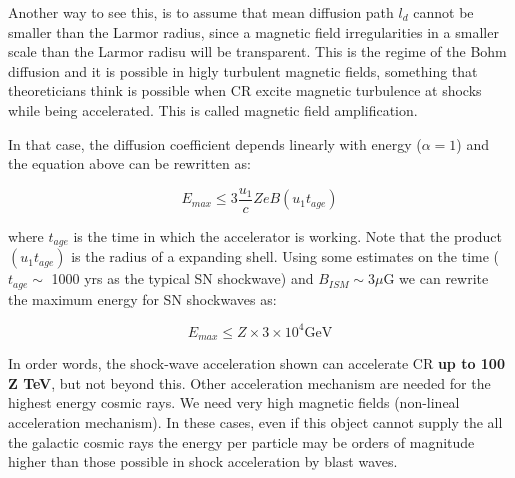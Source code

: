 \documentclass[
  letterpaper,
  DIV=11,
  numbers=noendperiod]{scrreprt}
\begin{document}
Another way to see this, is to assume that mean diffusion path \(l_d\)
cannot be smaller than the Larmor radius, since a magnetic field
irregularities in a smaller scale than the Larmor radisu will be
transparent. This is the regime of the Bohm diffusion and it is possible
in higly turbulent magnetic fields, something that theoreticians think
is possible when CR excite magnetic turbulence at shocks while being
accelerated. This is called magnetic field amplification.

In that case, the diffusion coefficient depends linearly with energy
(\(\alpha = 1\)) and the equation above can be rewritten as:

\[E_{max} \leq 3 \frac{u_1}{c} Z e B (u_1 t_{age})\]

where \(t_{age}\) is the time in which the accelerator is working. Note
that the product \((u_1 t_{age})\) is the radius of a expanding shell.
Using some estimates on the time (\(t_{age} \sim\) 1000 yrs as the
typical SN shockwave) and \(B_{ISM} \sim 3 \mu\)G we can rewrite the
maximum energy for SN shockwaves as:

\[E_{max} \leq Z\times 3 \times 10^4 \mathrm{ GeV}\]

In order words, the shock-wave acceleration shown can accelerate CR
\textbf{up to 100 Z TeV}, but not beyond this. Other acceleration
mechanism are needed for the highest energy cosmic rays. We need very
high magnetic fields (non-lineal acceleration mechanism). In these
cases, even if this object cannot supply the all the galactic cosmic
rays the energy per particle may be orders of magnitude higher than
those possible in shock acceleration by blast waves.
\end{document}
